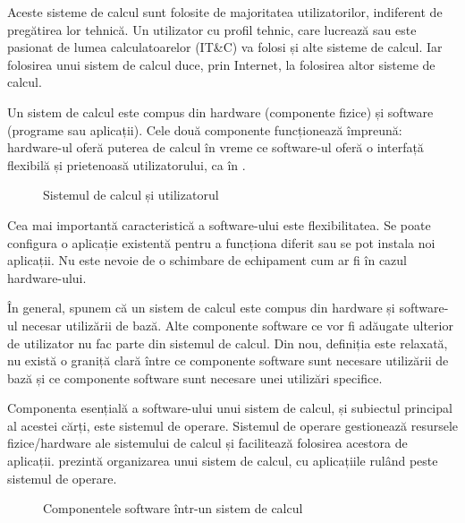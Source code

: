 Aceste sisteme de calcul sunt folosite de majoritatea utilizatorilor, indiferent de pregătirea lor tehnică.
Un utilizator cu profil tehnic, care lucrează sau este pasionat de lumea calculatoarelor (IT\&C) va folosi și alte sisteme de calcul.
Iar folosirea unui sistem de calcul duce, prin Internet, la folosirea altor sisteme de calcul.

Un sistem de calcul este compus din hardware (componente fizice) și software (programe sau aplicații).
Cele două componente funcționează împreună: hardware-ul oferă puterea de calcul în vreme ce software-ul oferă o interfață flexibilă și prietenoasă utilizatorului, ca în .

\begin{figure}[htbp]
  \centering
  \def\svgwidth{\columnwidth}
  
  \caption{Sistemul de calcul și utilizatorul}
  \label{fig:intro:computing-system}
\end{figure}

Cea mai importantă caracteristică a software-ului este flexibilitatea.
Se poate configura o aplicație existentă pentru a funcționa diferit sau se pot instala noi aplicații.
Nu este nevoie de o schimbare de echipament cum ar fi în cazul hardware-ului.

În general, spunem că un sistem de calcul este compus din hardware și software-ul necesar utilizării de bază.
Alte componente software ce vor fi adăugate ulterior de utilizator nu fac parte din sistemul de calcul.
Din nou, definiția este relaxată, nu există o graniță clară între ce componente software sunt necesare utilizării de bază și ce componente software sunt necesare unei utilizări specifice.

Componenta esențială a software-ului unui sistem de calcul, și subiectul principal al acestei cărți, este sistemul de operare.
Sistemul de operare gestionează resursele fizice/hardware ale sistemului de calcul și facilitează folosirea acestora de aplicații.
 prezintă organizarea unui sistem de calcul, cu aplicațiile rulând peste sistemul de operare.

\begin{figure}[htbp]
  \centering
  \def\svgwidth{\columnwidth}
  
  \caption{Componentele software într-un sistem de calcul}
  \label{fig:intro:computing-software}
\end{figure}

